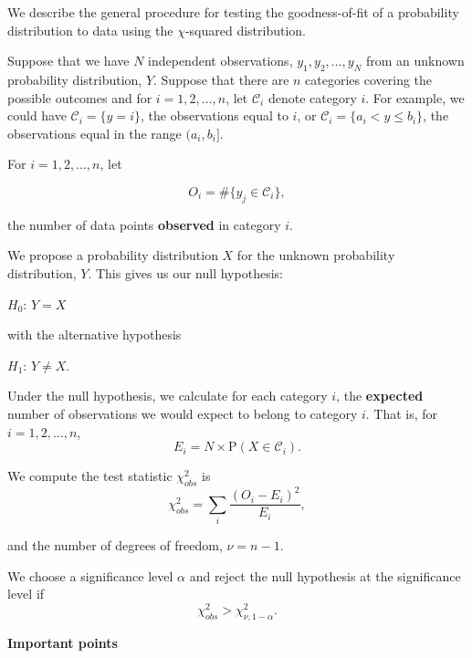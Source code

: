 \documentclass[
]{book}
\begin{document}
We describe the general procedure for testing the goodness-of-fit of a probability distribution to data using the \(\chi\)-squared distribution.

Suppose that we have \(N\) independent observations, \(y_1, y_2, \ldots, y_N\) from an unknown probability distribution, \(Y\). Suppose that there are \(n\) categories covering the possible outcomes and for \(i=1,2,\ldots, n\), let \(\mathcal{C}_i\) denote category \(i\). For example, we could have \(\mathcal{C}_i = \{ y = i\}\), the observations equal to \(i\), or \(\mathcal{C}_i = \{ a_i < y \leq b_i\}\), the observations equal in the range \((a_i, b_i]\).

For \(i=1,2,\ldots, n\), let

\[ O_i = \# \{y_j \in \mathcal{C}_i\}, \]

the number of data points {\textbf{observed}} in category \(i\).

We propose a probability distribution \(X\) for the unknown probability distribution, \(Y\). This gives us our null hypothesis:

\(H_0\): \(Y =X\)

with the alternative hypothesis

\(H_1\): \(Y \neq X\).

Under the null hypothesis, we calculate for each category \(i\), the {\textbf{expected}} number of observations we would expect to belong to category \(i\). That is, for \(i=1,2,\ldots,n\),\\

\[ E_i = N \times \mathrm{P} (X \in \mathcal{C}_i). \]

We compute the test statistic \(\chi_{obs}^2\) is\\

\[ \chi^2_{obs} = \sum_i \frac{(O_i - E_i)^2 }{E_i}, \]

and the number of degrees of freedom, \(\nu = n -1\).

We choose a significance level \(\alpha\) and reject the null hypothesis at the significance level if\\

\[ \chi^2_{obs} > \chi^2_{\nu, 1-\alpha}.\]

{\textbf{Important points}}
\end{document}
